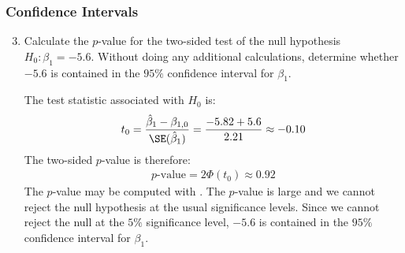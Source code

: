 \begin{frame}
\frametitle{Confidence Intervals}
\ask

\begin{enumerate}\setcounter{enumi}{2}

\item Calculate the $p$-value for the two-sided test of the null hypothesis $H_{0}\colon\beta_{1}=-5.6$. Without doing any additional calculations, determine whether $-5.6$ is contained in the $95\%$ confidence interval for $\beta_{1}$.

\begin{answer}
The test statistic associated with $H_{0}$ is:
\begin{align*}
t_{0} 
    = \frac{\hat{\beta}_{1}-\beta_{1,0}}{\SE(\hat{\beta}_{1})}
    = \frac{-5.82+5.6}{2.21}
    \approx -0.10
\end{align*} 
The two-sided $p$-value is therefore:
\begin{align*}
p\text{-value} 
    = 2 \Phi(t_{0})
    \approx 0.92 
\end{align*} 
The $p$-value may be computed with .
The $p$-value is large and we cannot reject the null hypothesis at the usual significance levels. Since we cannot reject the null at the $5\%$ significance level, $-5.6$ is contained in the $95\%$ confidence interval for $\beta_{1}$.
\end{answer}

\end{enumerate}
\end{frame}



